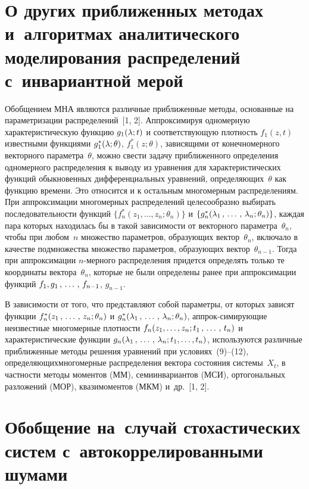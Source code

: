 \begin{multicols}{2}
\section{О других приближенных методах и~алгоритмах аналитического моделирования 
распределений с~инвариантной мерой}

\vspace*{-2pt}

 Обобщением МНА являются различные
приближенные методы, основанные на параметризации распределений~[1, 2].
Аппроксимируя одномерную характеристическую функцию $g_1 (\lambda;t)$
и соответствующую плотность $f_1 (z,t)$ известными функциями
 $g_1^* (\lambda;\theta)$, $f_1^* (z;\theta)$,  зависящими от
конечномерного векторного параметра~$\theta$, можно свести задачу
приближенного определения одномерного распределения к выводу из
уравнения для характеристических функций обыкновенных
дифференциальных уравнений, определяющих~$\theta$ как функцию
времени. Это относится и к остальным многомерным распределениям.
При аппроксимации многомерных распределений целесообразно выбирать
последовательности функций $\{ f_n^* (z_1,\ldots,z_n;\theta_n)\}$ и 
$\{g_n^* (\lambda_1\,,\,\ldots\,,\, \lambda_n;\theta_n)\}$, каждая пара
которых находилась бы в такой  зависимости от векторного параметра~$\theta_n$, 
чтобы при любом~$n$ множество параметров, образующих
вектор~$\theta_n$, включало в качестве подмножества множество
параметров, образующих вектор~$\theta_{n-1}$. Тогда при
аппроксимации $n$-мер\-но\-го распределения придется определять только
те координаты вектора~$\theta_n$, которые не были определены ранее
при аппроксимации функций $f_1, g_1\,,\,\ldots\,,\, f_{n-1}$, $g_{n-1}$.

В зависимости от того, что представляют собой параметры, от
которых зависят функции $f_n^* (z_1\,,\,\ldots\,,\, z_n;\theta_n)$ и 
$g_n^* (\lambda_1\,,\,\ldots\,,\, \lambda_n;\theta_n)$, аппрок-\linebreak симирующие неизвестные
многомерные плотности $f_n (z_1,  \ldots,z_n; t_1 \,,\,\ldots\,,\, t_n)$ и
характеристические функции $g_n (\lambda_1\,,\,\ldots\,,\, \lambda_n; t_1,\ldots,t_n)$,
используются различные приближенные методы решения
 уравнений при условиях~(9)--(12), определяющих\linebreak многомерные
распределения вектора состояния сис\-те\-мы~$X_t$, в частности методы
моментов (ММ), семиинвариантов (МСИ), ортогональных разложений
(МОР), квазимоментов (МКМ) и~др.~[1, 2].

\vspace*{-6pt}


\section{Обобщение на~случай стохастических систем с~автокоррелированными шумами}


\end{multicols}
